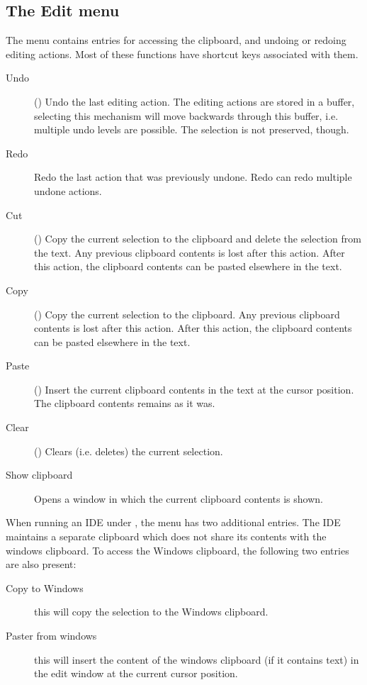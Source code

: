 \subsection{The Edit menu}
\label{se:menuedit}
The  menu contains entries for accessing the clipboard, and
undoing or redoing editing actions. Most of these functions have shortcut
keys associated with them.
\begin{description}
\item[Undo] ()
Undo the last editing action. The editing actions are stored in a buffer,
selecting this mechanism will move backwards through this buffer, i.e.
multiple undo levels are possible. The selection is not preserved, though.
\item[Redo] Redo the last action that was previously undone. Redo can redo
multiple undone actions. 
\item[Cut] () Copy the current selection to the clipboard
and delete the selection from the text. Any previous clipboard contents is
lost after this action. After this action, the clipboard contents can be 
pasted elsewhere in the text.
\item[Copy] () Copy the current selection to the clipboard.
Any previous clipboard contents is lost after this action. 
After this action, the clipboard contents can be pasted elsewhere in the text.
\item[Paste] () Insert the current clipboard contents in
the text at the cursor position. The clipboard contents remains as it was.
\item[Clear] () Clears (i.e. deletes) the current
selection.
\item[Show clipboard] Opens a window in which the current clipboard contents
is shown.
\end{description}
When running an IDE under \windows, the  menu has two
additional entries. The IDE maintains a separate clipboard which does 
not share its contents with the windows clipboard. To access the Windows
clipboard, the following two entries are also present:
\begin{description}
\item[Copy to Windows] this will copy the selection to the Windows
clipboard. 
\item[Paster from windows] this will insert the content of the windows
clipboard (if it contains text) in the edit window at the current cursor
position.
\end{description}

